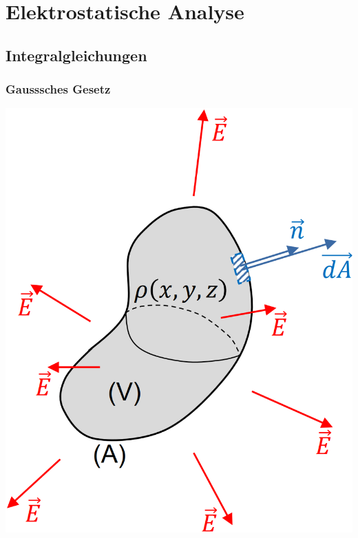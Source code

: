 \section{Elektrostatische Analyse}
\subsection{Integralgleichungen}
\subsubsection{Gausssches Gesetz}
\begin{minipage}[c]{0.36\columnwidth}
    \includegraphics[width=\columnwidth]{images/V1B0.png}
\end{minipage}
\hfill
